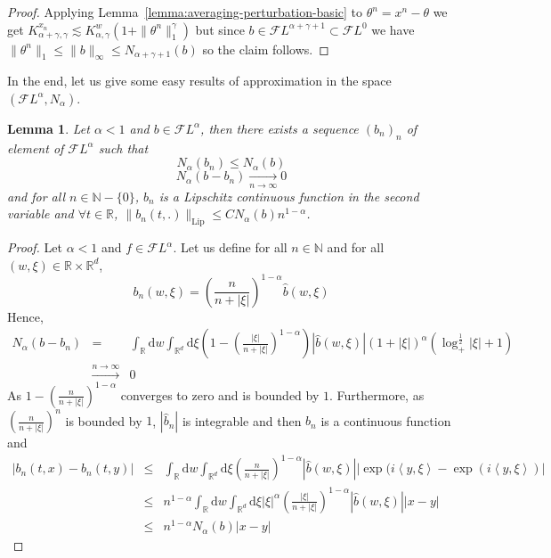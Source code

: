 \documentclass[11pt,a4paper,draft,reqno]{amsart}
\newtheorem{lemma}{Lemma}
\theoremstyle{definition}
\newcommand{\RR}{\mathbb{R}}
\newcommand{\cF}{\mathcal{F}}
\newcommand{\dd}{\mathrm{d}}
\newcommand{\la}{\left\langle}
\newcommand{\ra}{\right\rangle}
\newcommand{\NN}{\mathbb{N}}
\begin{document}
\begin{proof}
Applying Lemma~\ref{lemma:averaging-perturbation-basic} to $\theta^n=x^n-\theta$ we get
$
K^{x_n}_{\alpha+\gamma,\gamma} \lesssim K^w_{\alpha,\gamma} (1+\|\theta^n\|_1^\gamma)
$
but since $b\in\cF L^{\alpha+\gamma+1}\subset \cF L^0$ we have $\|\theta^n\|_1 \le \|b\|_\infty \le N_{\alpha+\gamma+1}(b)$ so the claim follows.
\end{proof}
\bigskip
In the end, let us give some easy results of approximation in the space $\left(\cF L^\alpha,N_\alpha\right)$.
\begin{lemma}\label{approximation dans alpha}
Let $\alpha<1$ and $b\in \cF L^{\alpha}$, then there exists a sequence $(b_n)_n$ of element of $\cF L^{\alpha}$ such that 
$$N_\alpha(b_n)\le N_\alpha(b)$$
$$N_\alpha(b-b_n)\underset{n\to\infty}{\to}0$$
and for all $n\in\NN-\{0\}$, $b_n$ is a Lipschitz continuous function in the second variable and $\forall t\in\RR$, $\|b_n(t,.)\|_{\mathrm{Lip}}\le C N_\alpha(b) n^{1-\alpha}$.
\end{lemma}

\begin{proof}
Let $\alpha<1$ and $f\in\cF L^\alpha$. Let us define for all $n\in \NN$ and for all $(w,\xi) \in \RR\times\RR^d$,
$$b_n(w,\xi) = \left(\frac{n}{n+|\xi|}\right)^{1-\alpha}\hat b (w,\xi)$$
Hence, 
\begin{eqnarray*}
N_\alpha(b-b_n)
&=&
\int_\RR \dd w \int_{\RR^d} \dd \xi \left(1-\left(\frac{|\xi|}{n+|\xi|}\right)^{1-\alpha}\right)\left|\hat b (w,\xi)\right|(1+|\xi|)^\alpha\left(\log_+^{\frac12}|\xi|+1\right)\\
&\overset{n\to\infty}{\to}&
0
\end{eqnarray*}
As $1-\left(\frac{n}{n+|\xi|}\right)^{1-\alpha}$ converges to zero and is bounded by $1$.
Furthermore, as $\left(\frac{n}{n+|\xi|}\right)^n$ is bounded by $1$, $|\hat b_n|$ is integrable and then $b_n$ is a continuous function and
\begin{eqnarray*}
\left|b_n(t,x)-b_n(t,y)\right|
&\le&
\int_\RR \dd w \int_{\RR^d} \dd \xi \left(\frac{n}{n+|\xi|}\right)^{1-\alpha}\left|\hat b (w,\xi)\right|\left|\exp(i\la y,\xi\ra - \exp(i\la y,\xi\ra)\right|\\
&\le&
n^{1-\alpha}\int_\RR \dd w \int_{\RR^d} \dd \xi |\xi|^{\alpha}\left(\frac{|\xi|}{n+|\xi|}\right)^{1-\alpha}\left|\hat b (w,\xi)\right|\left|x-y\right|\\
&\le&
n^{1-\alpha}N_{\alpha}(b)|x-y|
\end{eqnarray*}
\end{proof}
\end{document}
